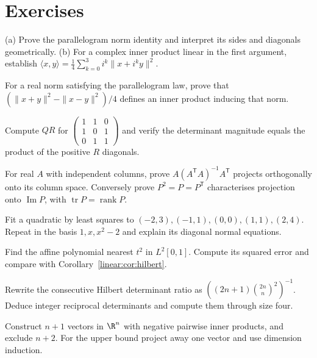 \section{Exercises}
\begin{exercise}[$\star$]\label{linear:ex:polar}
(a) Prove the parallelogram norm identity and interpret its sides and diagonals geometrically. (b) For a complex inner product linear in the first argument, establish $\langle x,y\rangle=\tfrac14\sum_{k=0}^3i^k\|x+i^ky\|^2$.
\end{exercise}
\begin{exercise}[$\star\star\star$]\label{linear:ex:jvn}
For a real norm satisfying the parallelogram law, prove that $(\|x+y\|^2-\|x-y\|^2)/4$ defines an inner product inducing that norm.
\end{exercise}
\begin{exercise}[$\star$]\label{linear:ex:qr}
Compute $QR$ for $\begin{pmatrix}1&1&0\\1&0&1\\0&1&1\end{pmatrix}$ and verify the determinant magnitude equals the product of the positive $R$ diagonals.
\end{exercise}
\begin{exercise}[$\star$]\label{linear:ex:projmatrix}
For real $A$ with independent columns, prove $A(A^{\mathsf T}A)^{-1}A^{\mathsf T}$ projects orthogonally onto its column space. Conversely prove $P^2=P=P^{\mathsf T}$ characterises projection onto $\operatorname{Im}P$, with $\operatorname{tr}P=\operatorname{rank}P$.
\end{exercise}
\begin{exercise}[$\star\star$]\label{linear:ex:parabola}
Fit a quadratic by least squares to $(-2,3),(-1,1),(0,0),(1,1),(2,4)$. Repeat in the basis $1,x,x^2-2$ and explain its diagonal normal equations.
\end{exercise}
\begin{exercise}[$\star$]\label{linear:ex:distpoly}
Find the affine polynomial nearest $t^2$ in $L^2[0,1]$. Compute its squared error and compare with Corollary~\ref{linear:cor:hilbert}.
\end{exercise}
\begin{exercise}[$\star$]\label{linear:ex:hilbertint}
Rewrite the consecutive Hilbert determinant ratio as $((2n+1)\binom{2n}n^2)^{-1}$. Deduce integer reciprocal determinants and compute them through size four.
\end{exercise}
\begin{exercise}[$\star\star$]\label{linear:ex:obtuse}
Construct $n+1$ vectors in $\R^n$ with negative pairwise inner products, and exclude $n+2$. For the upper bound project away one vector and use dimension induction.
\end{exercise}
